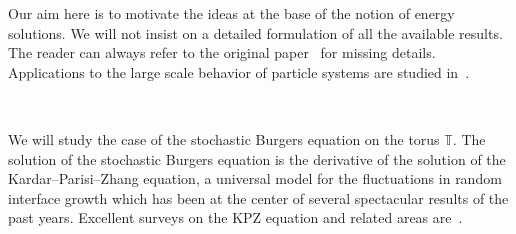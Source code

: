 \documentclass[a4paper,11pt]{article}
\begin{document}
Our aim here is to motivate the ideas at the base of the notion of energy
solutions. We will not insist on a detailed formulation of all the available
results. The reader can always refer to the original
paper~{\cite{gubinelli_regularization_2013}} for missing details. Applications
to the large scale behavior of particle systems are studied
in~{\cite{goncalves_universality_2010,goncalves_kpznew_2014}}.

\

We will study  the case of the stochastic Burgers equation on the
torus $\mathbb{T}$. The solution of the stochastic Burgers equation is the derivative of the solution of the Kardar--Parisi--Zhang equation, a universal model for the fluctuations in random interface growth which has been at the center of several spectacular results of the past years. Excellent surveys on the KPZ equation and related areas are~\cite{CorwinSurvey2012, QuastelSurvey2012, Quastel2015}.
\end{document}
